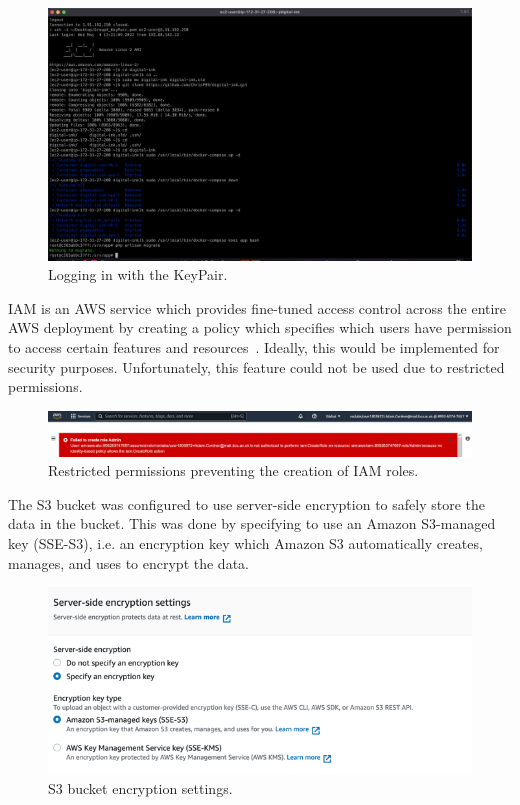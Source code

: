 \begin{figure}[!htbp]
    \centering
    \includegraphics[width=\textwidth]{resources/log-in-with-key-pair}
    \caption{Logging in with the KeyPair.}
    \label{fig:log-in-keypair-pem}
\end{figure}

IAM is an AWS service which provides fine-tuned access control across the entire AWS deployment by creating a policy
which specifies which users have permission to access certain features and resources~\parencite{amazon2022aws2}.
Ideally, this would be implemented for security purposes.
Unfortunately, this feature could not be used due to restricted permissions.

\begin{figure}[!htbp]
    \centering
    \includegraphics[width=\textwidth]{resources/iam-denied}
    \caption{Restricted permissions preventing the creation of IAM roles.}
    \label{fig:iam-denied}
\end{figure}

The S3 bucket was configured to use server-side encryption to safely store the data in the bucket.
This was done by specifying to use an Amazon S3-managed key (SSE-S3), i.e. an encryption key which Amazon S3
automatically creates, manages, and uses to encrypt the data.

\begin{figure}[!htbp]
    \centering
    \includegraphics[width=\textwidth]{resources/s3_encryption}
    \caption{S3 bucket encryption settings.}
    \label{fig:s3-encryption}
\end{figure}

